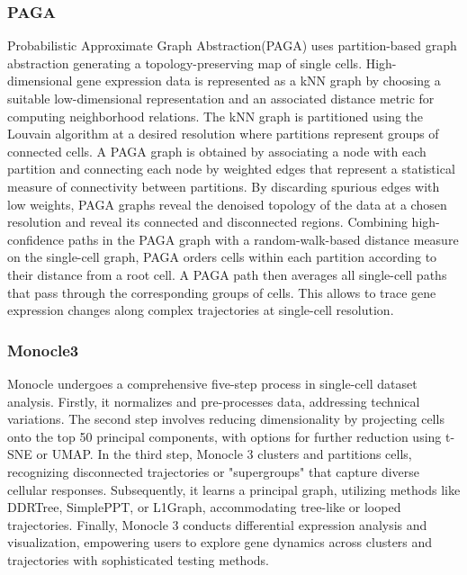 \subsubsection{PAGA} 
Probabilistic Approximate Graph Abstraction(PAGA) uses partition-based graph abstraction generating a topology-preserving map of single cells. High-dimensional gene expression data is represented as a kNN graph by choosing a suitable low-dimensional representation and an associated distance metric for computing neighborhood relations. The kNN graph is partitioned using the Louvain algorithm at a desired resolution where partitions represent groups of connected cells. A PAGA graph is obtained by associating a node with each partition and connecting each node by weighted edges that represent a statistical measure of connectivity between partitions. By discarding spurious edges with low weights, PAGA graphs reveal the denoised topology of the data at a chosen resolution and reveal its connected and disconnected regions. Combining high-confidence paths in the PAGA graph with a random-walk-based distance measure on the single-cell graph, PAGA orders cells within each partition according to their distance from a root cell. A PAGA path then averages all single-cell paths that pass through the corresponding groups of cells. This allows to trace gene expression changes along complex trajectories at single-cell resolution.

\subsubsection{Monocle3}
Monocle undergoes a comprehensive five-step process in single-cell dataset analysis. Firstly, it normalizes and pre-processes data, addressing technical variations. The second step involves reducing dimensionality by projecting cells onto the top 50 principal components, with options for further reduction using t-SNE or UMAP. In the third step, Monocle 3 clusters and partitions cells, recognizing disconnected trajectories or "supergroups" that capture diverse cellular responses. Subsequently, it learns a principal graph, utilizing methods like DDRTree, SimplePPT, or L1Graph, accommodating tree-like or looped trajectories. Finally, Monocle 3 conducts differential expression analysis and visualization, empowering users to explore gene dynamics across clusters and trajectories with sophisticated testing methods.
